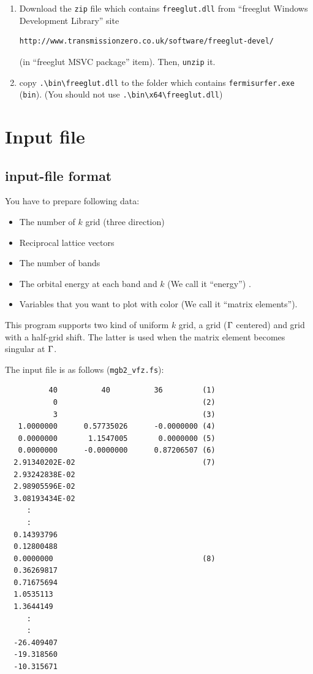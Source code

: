\documentclass[12pt]{article}
\begin{document}
\begin{enumerate}

\item Download the \verb|zip| file which contains \verb|freeglut.dll|
from ``freeglut Windows Development Library'' site
\begin{verbatim}
http://www.transmissionzero.co.uk/software/freeglut-devel/
\end{verbatim}
(in ``freeglut MSVC package'' item).
Then, \verb|unzip| it.

\item copy \verb|.\bin\freeglut.dll| to the folder which contains
 \verb|fermisurfer.exe| (\verb|bin|).
 (You should not use \verb|.\bin\x64\freeglut.dll|)

\end{enumerate}

\section{Input file}

\subsection{input-file format}

You have to prepare following data:
\begin{itemize}
\item The number of $k$ grid (three direction)
\item Reciprocal lattice vectors
\item The number of bands
\item The orbital energy at each band and $k$ (We call it ``energy'') .
\item Variables that you want to plot with color (We call it ``matrix elements'').
\end{itemize}

This program supports two kind of uniform $k$ grid,
a grid (${\rm \Gamma}$ centered) and grid with a half-grid shift.
The latter is used when the matrix element becomes singular 
at ${\rm \Gamma}$.

The input file is as follows (\verb|mgb2_vfz.fs|):

\begin{verbatim}
          40          40          36         (1)
           0                                 (2)
           3                                 (3)
   1.0000000      0.57735026      -0.0000000 (4)
   0.0000000       1.1547005       0.0000000 (5)
   0.0000000      -0.0000000      0.87206507 (6)
  2.91340202E-02                             (7)
  2.93242838E-02
  2.98905596E-02
  3.08193434E-02
     :
     :
  0.14393796
  0.12800488
  0.0000000                                  (8)
  0.36269817
  0.71675694
  1.0535113
  1.3644149
     :
     :
  -26.409407
  -19.318560
  -10.315671
\end{verbatim}
\end{document}
